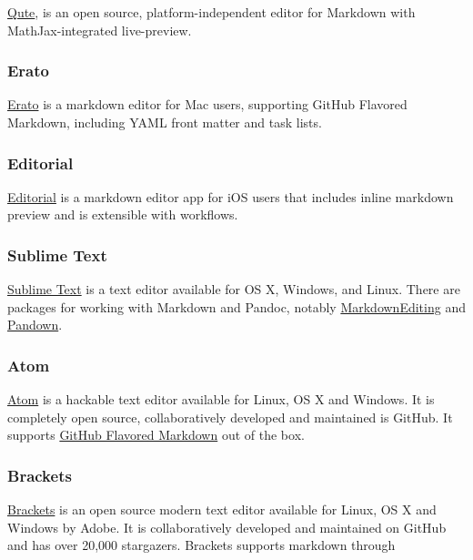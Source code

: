 \documentclass[	DIV=calc,%
							paper=a4,%
							fontsize=10pt]{scrartcl}	 					%
\begin{document}
\href{https://github.com/fbreuer/qute}{Qute}, is an open source,
platform-independent editor for Markdown with MathJax-integrated
live-preview.

\subsubsection{Erato}\label{erato}

\href{http://9muses.se/erato/}{Erato} is a markdown editor for Mac
users, supporting GitHub Flavored Markdown, including YAML front matter
and task lists.

\subsubsection{Editorial}\label{editorial}

\href{omz-software.com/editorial/}{Editorial} is a markdown editor app
for iOS users that includes inline markdown preview and is extensible
with workflows.

\subsubsection{Sublime Text}\label{sublime-text}

\href{http://www.sublimetext.com}{Sublime Text} is a text editor
available for OS X, Windows, and Linux. There are packages for working
with Markdown and Pandoc, notably
\href{https://packagecontrol.io/packages/MarkdownEditing}{MarkdownEditing}
and \href{https://packagecontrol.io/packages/Pandown}{Pandown}.

\subsubsection{Atom}\label{atom}

\href{https://atom.io/}{Atom} is a hackable text editor available for
Linux, OS X and Windows. It is completely open source, collaboratively
developed and maintained is GitHub. It supports
\href{https://help.github.com/articles/github-flavored-markdown/}{GitHub
Flavored Markdown} out of the box.

\subsubsection{Brackets}\label{brackets}

\href{http://brackets.io/}{Brackets} is an open source modern text
editor available for Linux, OS X and Windows by Adobe. It is
collaboratively developed and maintained on GitHub and has over 20,000
stargazers. Brackets supports markdown through
\end{document}
